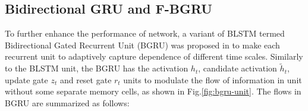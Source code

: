 \documentclass[review]{elsarticle}
\begin{document}
\subsection{Bidirectional GRU and F-BGRU}\label{sec:bgru}
To further enhance the performance of network, a variant of BLSTM termed Bidirectional Gated Recurrent Unit (BGRU) was proposed in\;\cite{cho2014arxiv,chung2014eprint} to make each recurrent unit to adaptively capture dependence of different time scales. Similarly to the BLSTM unit, the BGRU has the activation $h_t$, candidate activation $\tilde{h}_t$, update gate $z_t$ and reset gate $r_t$ units to modulate the flow of information in unit without some separate memory cells, as shown in Fig.\;\ref{fig:bgru-unit}. The flows in BGRU are summarized as follows:
\end{document}
